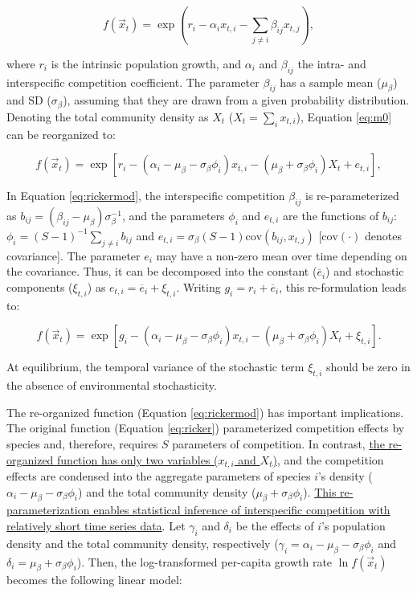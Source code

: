 \documentclass[12pt, class=article, crop=false]{standalone}
\begin{document}
\begin{equation}
\label{eq:ricker}
f(\overset{\rightarrow}{x}_{t}) = \exp(r_i - \alpha_i x_{t,i} - \sum_{j \ne i} \beta_{ij} x_{t,j}),
\end{equation}

where $r_i$ is the intrinsic population growth, and $\alpha_{i}$ and $\beta_{ij}$ the intra- and interspecific competition coefficient.
The parameter $\beta_{ij}$ has a sample mean ($\mu_{\beta}$) and SD ($\sigma_{\beta}$), assuming that they are drawn from a given probability distribution. 
Denoting the total community density as $X_t$ ($X_t = \sum_i x_{t,i}$), Equation \ref{eq:m0} can be reorganized to:

\begin{equation}
\label{eq:rickermod}
f(\overset{\rightarrow}{x}_{t}) = \exp\left[r_i - (\alpha_i - \mu_{\beta} - \sigma_{\beta} \phi_i) x_{t,i} - (\mu_{\beta} +  \sigma_{\beta} \phi_i) X_t + e_{t,i} \right],
\end{equation}

In Equation \ref{eq:rickermod}, the interspecific competition $\beta_{ij}$ is re-parameterized as $b_{ij} = (\beta_{ij} - \mu_{\beta}) \sigma_{\beta}^{-1}$, and the parameters $\phi_{i}$ and $e_{t,i}$ are the functions of $b_{ij}$: $\phi_i = (S-1)^{-1}\sum_{j \ne i} b_{ij}$ and $e_{t,i} = \sigma_{\beta} (S - 1) \mbox{cov}(b_{ij}, x_{t,j})$ [$\mbox{cov}(\cdot)$ denotes covariance].
The parameter $e_i$ may have a non-zero mean over time depending on the covariance.
Thus, it can be decomposed into the constant ($\overline{e}_i$) and stochastic components ($\xi_{t,i}$) as $e_{t,i} = \overline{e}_i + \xi_{t,i}$.
Writing $g_{i} = r_i + \overline{e}_i$, this re-formulation leads to:

\begin{equation}
    f(\overset{\rightarrow}{x}_{t}) = \exp\left[g_{i} - (\alpha_i - \mu_{\beta} - \sigma_{\beta} \phi_i) x_{t,i} - (\mu_{\beta} +  \sigma_{\beta} \phi_i) X_t + \xi_{t,i} \right].
\end{equation}

At equilibrium, the temporal variance of the stochastic term $\xi_{t,i}$ should be zero in the absence of environmental stochasticity.

The re-organized function (Equation \ref{eq:rickermod}) has important implications. 
The original function (Equation \ref{eq:ricker}) parameterized competition effects by species and, therefore, requires $S$ parameters of competition.
In contrast, \ul{the re-organized function has only two variables ($x_{t,i}$ and $X_t$)}, and the competition effects are condensed into the aggregate parameters of species $i$'s density ($\alpha_i - \mu_{\beta} - \sigma_{\beta} \phi_i$) and the total community density ($\mu_{\beta} + \sigma_{\beta} \phi_i$).
\ul{This re-parameterization enables statistical inference of interspecific competition with relatively short time series data}.
Let $\gamma_i$ and $\delta_i$ be the effects of $i$'s population density and the total community density, respectively ($\gamma_i = \alpha_i - \mu_{\beta} - \sigma_{\beta} \phi_i$ and $\delta_i = \mu_{\beta} + \sigma_{\beta} \phi_i$).
Then, the log-transformed per-capita growth rate $\ln f(\overset{\rightarrow}{x}_{t})$ becomes the following linear model:
\end{document}

